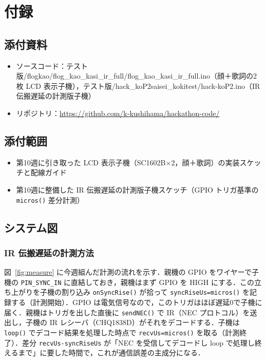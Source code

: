 \documentclass[a4paper,11pt]{ltjsarticle}
\providecommand{\％}{\%}
\begin{document}
\section{付録}\label{sec:appendix}

\subsection{添付資料}\label{sec:attach}

\begin{itemize}
    \item ソースコード：テスト版/flogkao/flog\_kao\_kasi\_ir\_full/flog\_kao\_kasi\_ir\_full.ino（顔＋歌詞の2枚 LCD 表示子機），テスト版/hack\_koP2saisei\_kokitest/hack-koP2.ino（IR 伝搬遅延の計測版子機）
    \item リポジトリ：\url{https://github.com/k-kushihama/hackathon-code/}
\end{itemize}

\subsection{添付範囲}\label{sec:attach-scope}

\begin{itemize}
    \item 第10週に引き取った LCD 表示子機（SC1602B$\times$2，顔＋歌詞）の実装スケッチと配線ガイド
    \item 第10週に整備した IR 伝搬遅延の計測版子機スケッチ（GPIO トリガ基準の \texttt{micros()} 差分計測）
\end{itemize}

\subsection{システム図}\label{sec:diagrams}

\subsubsection{IR 伝搬遅延の計測方法}\label{sec:measure-diag}

図~\ref{fig:measure} に今週組んだ計測の流れを示す．親機の GPIO をワイヤーで子機の \texttt{PIN\_SYNC\_IN} に直結しておき，親機はまず GPIO を HIGH にする．この立ち上がりを子機の割り込み \texttt{onSyncRise()} が拾って \texttt{syncRiseUs=micros()} を記録する（計測開始）．GPIO は電気信号なので，このトリガはほぼ遅延0で子機に届く．親機はトリガを出した直後に \texttt{sendNEC()} で IR（NEC プロトコル）を送出し，子機の IR レシーバ（CHQ1838D）がそれをデコードする．子機は \texttt{loop()} でデコード結果を処理した時点で \texttt{recvUs=micros()} を取る（計測終了）．差分 \texttt{recvUs-syncRiseUs} が「NEC を受信してデコードし loop で処理し終えるまで」に要した時間で，これが通信誤差の主成分になる．
\end{document}
